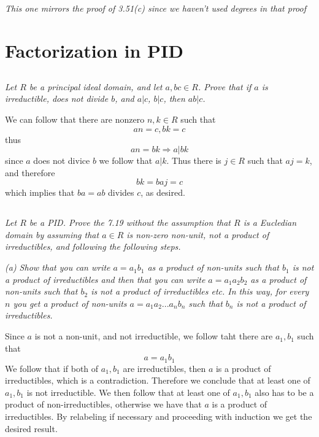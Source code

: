 \documentclass[11pt,oneside,titlepage]{book}
\DeclareMathOperator \ra {\Rightarrow}
\begin{document}
\subsection{}

\textit{This one mirrors the proof of 3.51(c) since we haven't used
  degrees in that proof}

\section{Factorization in PID}

\subsection{}

\textit{Let $R$ be a principal ideal domain, and let $a, b c \in R$. Prove that
  if $a$ is irreductible, does not divide $b$, and $a | c$, $b | c$, then $ab | c$.}

We can follow that there are nonzero $n ,k \in R$ such that
$$an = c, bk = c$$
thus
$$an = bk \ra a | bk$$
since $a$ does not divice $b$ we follow that $a | k$. Thus there is $j \in R$
such that $aj = k$, and therefore
$$bk = b aj = c$$
which implies that $ba = ab$ divides $c$, as desired.

\subsection{}

\textit{Let $R$ be a PID. Prove the 7.19 without the assumption that
  $R$ is a Eucledian domain by assuming that $a \in R$ is non-zero
  non-unit, not a product of irreductibles, and following the following
  steps.
}

\textit{(a) Show that you can write $a = a_1 b_1$ as a product of
  non-units such that $b_1$ is not a product of irreductibles and then
  that you can write $a = a_1 a_2 b_2$ as a product of non-units such
  that $b_2$ is not a product of irreductibles etc. In this way, for
  every $n$ you get a product of non-units $a = a_1 a_2 ... a_n b_n$
  such that $b_n$ is not a product of irreductibles. 
}

Since $a$ is not a non-unit, and not irreductible, we follow taht
there are $a_1, b_1$ such that
$$a = a_1 b_1$$
We follow that if both of $a_1, b_1$ are irreductibles, then $a$ is a
product of irreductibles, which is a contradiction. Therefore we
conclude that at least one of $a_1, b_1$ is not irreductible. We then
follow that at least one of $a_1, b_1$ also has to be a product of
non-irreductibles, otherwise we have that $a$ is a product of
irreductibles. By relabeling if necessary and proceeding with induction
we get the desired result.
\end{document}

